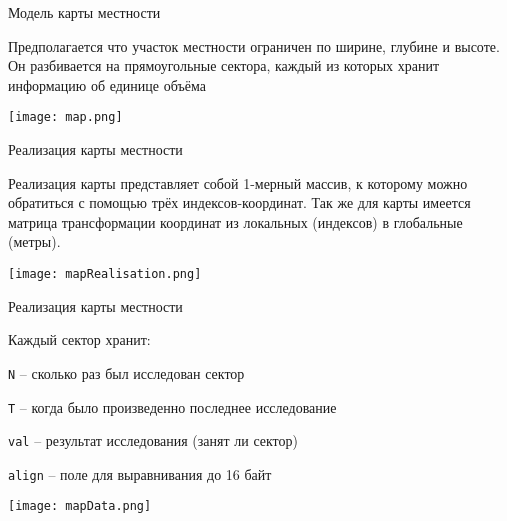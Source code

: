 \begin{tslide}{Модель карты местности}

    Предполагается что участок местности ограничен по ширине,
    глубине и высоте.
    Он разбивается на прямоугольные сектора, каждый из которых хранит
    информацию об единице объёма
    \vfill

    \begin{center}
    \texttt{[image: map.png]}
    \end{center}
    \vfill

\end{tslide}

\begin{tslide}{Реализация карты местности}

    Реализация карты представляет собой 1-мерный массив,
    к которому можно обратиться с помощью трёх индексов-координат.
    Так же для карты имеется матрица трансформации координат
    из локальных (индексов) в глобальные (метры).
    \vfill

    \begin{center}
    \texttt{[image: mapRealisation.png]}
    \end{center}
    \vfill

\end{tslide}

\begin{tslide}{Реализация карты местности}

    Каждый сектор хранит:

    \begin{mintemize}
    \item {\Large\verb|N|} -- сколько раз был исследован сектор
    \item {\Large\verb|T|} -- когда было произведенно последнее исследование
    \item {\Large\verb|val|} -- результат исследования (занят ли сектор)
    \item {\Large\verb|align|} -- поле для выравнивания до 16 байт
    \end{mintemize}

    \vfill

    \begin{center}
    \texttt{[image: mapData.png]}
    \end{center}

    \vfill

\end{tslide}

